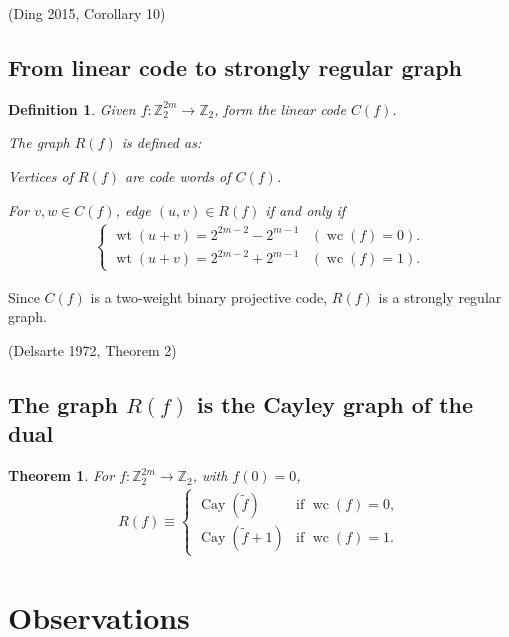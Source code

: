 \documentclass[12pt,a4paper]{article}
\newcommand{\mb}[1]{\mathbb{#1}}
\newcommand{\Z}{\mb{Z}}
\newcommand{\To}{\rightarrow}
\newcommand{\slidecite}[1]{\tiny{(#1)}\normalsize{}}
\newcommand{\Cay}[1]{\operatorname{Cay}\left(#1\right)}
\newcommand{\dual}[1]{\widetilde{#1}}
\newcommand{\weight}[1]{\operatorname{wt}\left(#1\right)}
\newcommand{\weightclass}[1]{\operatorname{wc}\left(#1\right)}
\newtheorem{Theorem}{Theorem}
\newtheorem{Definition}{Definition}
\begin{document}
\slidecite{Ding 2015, Corollary 10} 
 
\subsection*{From linear code to strongly regular graph}
\begin{Definition}

Given $f : \Z_2^{2m} \To \Z_2$, form the linear code $C(f)$.

The graph $R(f)$ is defined as:

Vertices of $R(f)$ are code words of $C(f)$.

For $v,w \in C(f)$, edge $(u,v) \in R(f)$ if and only if
\begin{align*}
\begin{cases}
\weight{u+v} = 2^{2m-2} - 2^{m-1} & (\weightclass{f}=0).
\\
\weight{u+v} = 2^{2m-2} + 2^{m-1} & (\weightclass{f}=1).
\end{cases}
\end{align*}
 
\end{Definition}
Since $C(f)$ is a two-weight binary projective code, 
$R(f)$ is a strongly regular graph.
 
\slidecite{Delsarte 1972, Theorem 2}
\subsection*{The graph $R(f)$ is the Cayley graph of the dual}

\begin{Theorem}
For $f : \Z_2^{2m} \To \Z_2$, with $f(0)=0$,
\begin{align*}
R(f) \equiv 
\begin{cases}
\Cay{\dual{f}} & \text{if~} \weightclass{f}=0,
\\
\Cay{\dual{f}+1} & \text{if~} \weightclass{f}=1.
\end{cases}
\end{align*}
 
\end{Theorem}

\section{Observations}
\end{document}

